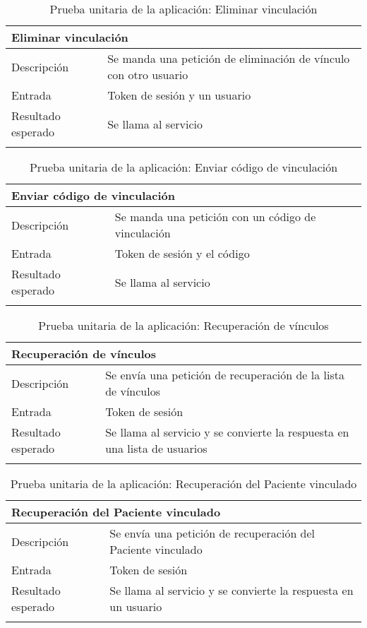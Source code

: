 \begin{longtable}{|p{} p{}|}
    \hline
    \multicolumn{2}{|l|}{\textbf{Eliminar vinculación}} \\ \hline 
    Descripción                 & Se manda una petición de eliminación de vínculo con otro usuario \\ \hline
    Entrada                     & Token de sesión y un usuario \\ \hline
    Resultado esperado          & Se llama al servicio \\ \hline
    \caption{Prueba unitaria de la aplicación: Eliminar vinculación}
    \label{cp:u:app:eliminar_vinculacion_repo}
\end{longtable}

\begin{longtable}{|p{} p{}|}
    \hline
    \multicolumn{2}{|l|}{\textbf{Enviar código de vinculación}} \\ \hline 
    Descripción                 & Se manda una petición con un código de vinculación \\ \hline
    Entrada                     & Token de sesión y el código \\ \hline
    Resultado esperado          & Se llama al servicio \\ \hline
    \caption{Prueba unitaria de la aplicación: Enviar código de vinculación}
    \label{cp:u:app:enviar_codigo_vinculacion_repo}
\end{longtable}

\begin{longtable}{|p{} p{}|}
    \hline
    \multicolumn{2}{|l|}{\textbf{Recuperación de vínculos}} \\ \hline 
    Descripción                 & Se envía una petición de recuperación de la lista de vínculos \\ \hline
    Entrada                     & Token de sesión \\ \hline
    Resultado esperado          & Se llama al servicio y se convierte la respuesta en una lista de usuarios \\ \hline
    \caption{Prueba unitaria de la aplicación: Recuperación de vínculos}
    \label{cp:u:app:recuperacion_vinculos_repo}
\end{longtable}

\vspace{-15pt}
\begin{longtable}{|p{} p{}|}
    \hline
    \multicolumn{2}{|l|}{\textbf{Recuperación del Paciente vinculado}} \\ \hline 
    Descripción                 & Se envía una petición de recuperación del Paciente vinculado \\ \hline
    Entrada                     & Token de sesión \\ \hline
    Resultado esperado          & Se llama al servicio y se convierte la respuesta en un usuario \\ \hline
    \caption{Prueba unitaria de la aplicación: Recuperación del Paciente vinculado}
    \label{cp:u:app:recuperacion_paciente_repo}
\end{longtable}

